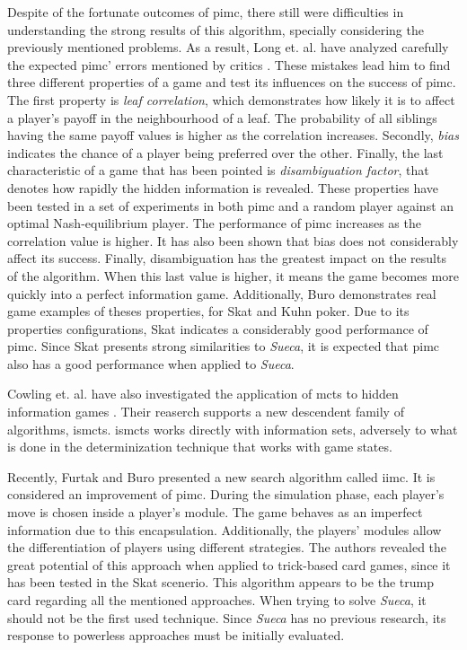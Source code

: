 Despite of the fortunate outcomes of \gls{pimc}, there still were difficulties in understanding the strong results of this algorithm, specially considering the previously mentioned problems.
As a result, Long et. al. have analyzed carefully the expected \gls{pimc}' errors mentioned by critics \cite{Long2010}.
These mistakes lead him to find three different properties of a game and test its influences on the success of \gls{pimc}.
The first property is \emph{leaf correlation}, which demonstrates how likely it is to affect a player's payoff in the neighbourhood of a leaf.
The probability of all siblings having the same payoff values is higher as the correlation increases.
Secondly, \emph{bias} indicates the chance of a player being preferred over the other.
Finally, the last characteristic of a game that has been pointed is \emph{disambiguation factor}, that denotes how rapidly the hidden information is revealed.
These properties have been tested in a set of experiments in both \gls{pimc} and a random player against an optimal Nash-equilibrium player.
The performance of \gls{pimc} increases as the correlation value is higher.
It has also been shown that bias does not considerably affect its success.
Finally, disambiguation has the greatest impact on the results of the algorithm.
When this last value is higher, it means the game becomes more quickly into a perfect information game.
Additionally, Buro demonstrates real game examples of theses properties, for Skat and Kuhn poker.
Due to its properties configurations, Skat indicates a considerably good performance of \gls{pimc}.
Since Skat presents strong similarities to \emph{Sueca}, it is expected that \gls{pimc} also has a good performance when applied to \emph{Sueca}.


Cowling et. al. have also investigated the application of \gls{mcts} to hidden information games \cite{Cowling2012}.
Their reaserch supports a new descendent family of algorithms, \gls{ismcts}.
\gls{ismcts} works directly with information sets, adversely to what is done in the determinization technique that works with game states.


Recently, Furtak and Buro \cite{Furtak} presented a new search algorithm called \gls{iimc}.
It is considered an improvement of \gls{pimc}.
During the simulation phase, each player's move is chosen inside a player's module.
The game behaves as an imperfect information due to this encapsulation.
Additionally, the players' modules allow the differentiation of players using different strategies.
The authors revealed the great potential of this approach when applied to trick-based card games, since it has been tested in the Skat scenerio.
This algorithm appears to be the trump card regarding all the mentioned approaches.
When trying to solve \emph{Sueca}, it should not be the first used technique.
Since \emph{Sueca} has no previous research, its response to powerless approaches must be initially evaluated.




